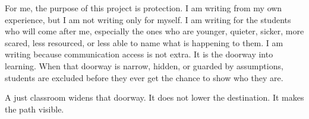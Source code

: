 \documentclass[12pt]{article}
\begin{document}
For me, the purpose of this project is protection. I am writing from my own experience, but I am not writing only for myself. I am writing for the students who will come after me, especially the ones who are younger, quieter, sicker, more scared, less resourced, or less able to name what is happening to them. I am writing because communication access is not extra. It is the doorway into learning. When that doorway is narrow, hidden, or guarded by assumptions, students are excluded before they ever get the chance to show who they are.

A just classroom widens that doorway. It does not lower the destination. It makes the path visible.

\newpage


\end{document}
